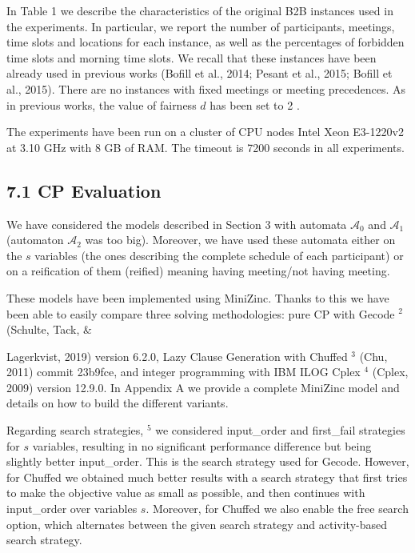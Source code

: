 \documentclass[10pt]{article}
\begin{document}
In Table 1 we describe the characteristics of the original B2B instances used in the experiments. In particular, we report the number of participants, meetings, time slots and locations for each instance, as well as the percentages of forbidden time slots and morning time slots. We recall that these instances have been already used in previous works (Bofill et al., 2014; Pesant et al., 2015; Bofill et al., 2015). There are no instances with fixed meetings or meeting precedences. As in previous works, the value of fairness $d$ has been set to 2 .

The experiments have been run on a cluster of CPU nodes Intel Xeon E3-1220v2 at 3.10 GHz with 8 GB of RAM. The timeout is 7200 seconds in all experiments.

\subsection*{7.1 CP Evaluation}
We have considered the models described in Section 3 with automata $\mathcal{A}_{0}$ and $\mathcal{A}_{1}$ (automaton $\mathcal{A}_{2}$ was too big). Moreover, we have used these automata either on the $s$ variables (the ones describing the complete schedule of each participant) or on a reification of them (reified) meaning having meeting/not having meeting.

These models have been implemented using MiniZinc. Thanks to this we have been able to easily compare three solving methodologies: pure CP with Gecode ${ }^{2}$ (Schulte, Tack, \&

Lagerkvist, 2019) version 6.2.0, Lazy Clause Generation with Chuffed ${ }^{3}$ (Chu, 2011) commit 23b9fce, and integer programming with IBM ILOG Cplex ${ }^{4}$ (Cplex, 2009) version 12.9.0. In Appendix A we provide a complete MiniZinc model and details on how to build the different variants.

Regarding search strategies, ${ }^{5}$ we considered input\_order and first\_fail strategies for $s$ variables, resulting in no significant performance difference but being slightly better input\_order. This is the search strategy used for Gecode. However, for Chuffed we obtained much better results with a search strategy that first tries to make the objective value as small as possible, and then continues with input\_order over variables $s$. Moreover, for Chuffed we also enable the free search option, which alternates between the given search strategy and activity-based search strategy.
\end{document}
